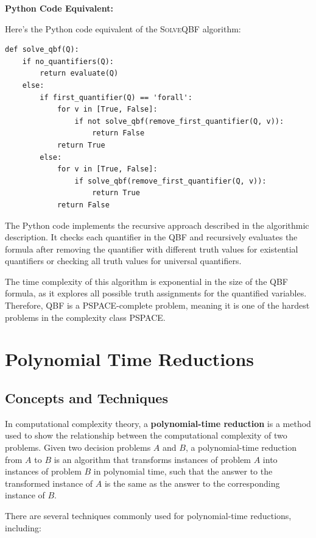 \documentclass[12pt]{book} %
\begin{document}
\FloatBarrier

\textbf{Python Code Equivalent:}

Here's the Python code equivalent of the \textsc{SolveQBF} algorithm:
\FloatBarrier
\begin{lstlisting}
def solve_qbf(Q):
    if no_quantifiers(Q):
        return evaluate(Q)
    else:
        if first_quantifier(Q) == 'forall':
            for v in [True, False]:
                if not solve_qbf(remove_first_quantifier(Q, v)):
                    return False
            return True
        else:
            for v in [True, False]:
                if solve_qbf(remove_first_quantifier(Q, v)):
                    return True
            return False
\end{lstlisting}
\FloatBarrier
The Python code implements the recursive approach described in the algorithmic description. It checks each quantifier in the QBF and recursively evaluates the formula after removing the quantifier with different truth values for existential quantifiers or checking all truth values for universal quantifiers.

The time complexity of this algorithm is exponential in the size of the QBF formula, as it explores all possible truth assignments for the quantified variables. Therefore, QBF is a PSPACE-complete problem, meaning it is one of the hardest problems in the complexity class PSPACE.


\section{Polynomial Time Reductions}

\subsection{Concepts and Techniques}
In computational complexity theory, a \textbf{polynomial-time reduction} is a method used to show the relationship between the computational complexity of two problems. Given two decision problems \(A\) and \(B\), a polynomial-time reduction from \(A\) to \(B\) is an algorithm that transforms instances of problem \(A\) into instances of problem \(B\) in polynomial time, such that the answer to the transformed instance of \(A\) is the same as the answer to the corresponding instance of \(B\).

There are several techniques commonly used for polynomial-time reductions, including:
\end{document}
